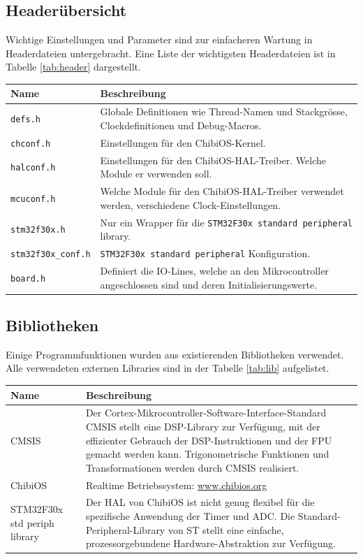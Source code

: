 \subsection*{Headerübersicht}
Wichtige Einstellungen und Parameter sind zur einfacheren Wartung in Headerdateien untergebracht. Eine Liste der wichtigsten Headerdateien ist in Tabelle \ref{tab:header} dargestellt.\\
\begin{tabularx}{\textwidth}{l|X}
	Name & Beschreibung \\ \hline
	\texttt{defs.h} & Globale Definitionen wie Thread-Namen und Stackgrösse, Clockdefinitionen und Debug-Macros. \\ \hline
	\texttt{chconf.h} & Einstellungen für den ChibiOS-Kernel. \\ \hline
	\texttt{halconf.h} & Einstellungen für den ChibiOS-HAL-Treiber. Welche Module er verwenden soll. \\ \hline
	\texttt{mcuconf.h} & Welche Module für den ChibiOS-HAL-Treiber verwendet werden, verschiedene Clock-Einstellungen. \\ \hline
	\texttt{stm32f30x.h} & Nur ein Wrapper für die \texttt{STM32F30x standard peripheral} library. \\ \hline
	\texttt{stm32f30x\_conf.h} & \texttt{STM32F30x standard peripheral} Konfiguration. \\ \hline
	\texttt{board.h} & Definiert die IO-Lines, welche an den Mikrocontroller angeschlossen sind und deren Initialisierungswerte. \\ \hline
\end{tabularx}
\label{tab:header}

\subsection*{Bibliotheken}
Einige Programmfunktionen wurden aus existierenden Bibliotheken verwendet. Alle verwendeten externen Libraries sind in der Tabelle \ref{tab:lib} aufgelistet.\\
\begin{tabularx}{\textwidth}{l|X}
	Name & Beschreibung \\ \hline
	CMSIS &  Der Cortex-Mikrocontroller-Software-Interface-Standard CMSIS stellt eine DSP-Library zur Verfügung, mit der effizienter Gebrauch der DSP-Instruktionen und der FPU gemacht werden kann. Trigonometrische Funktionen und Transformationen werden durch CMSIS realisiert. \\ \hline
	ChibiOS & Realtime Betriebssystem: \url{www.chibios.org} \\ \hline
	STM32F30x std periph library & Der HAL von ChibiOS ist nicht genug flexibel für die spezifische Anwendung der Timer und ADC. Die Standard-Peripheral-Library von ST stellt eine einfache, prozessorgebundene Hardware-Abstraktion zur Verfügung.  \\ \hline
\end{tabularx}
\label{tab:lib}


